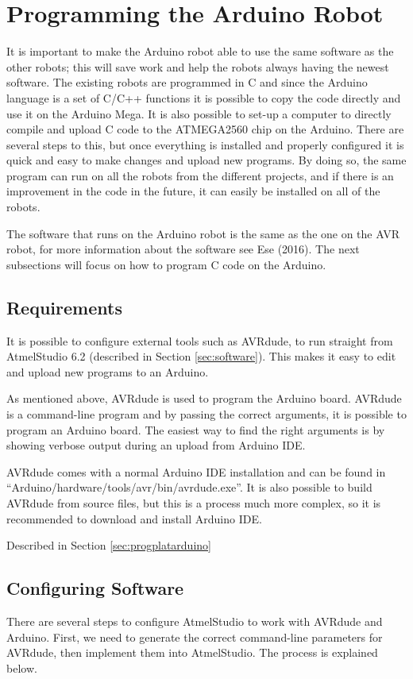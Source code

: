 \section{Programming the Arduino Robot}
\label{sec:programardu}
It is important to make the Arduino robot able to use the same software as the other robots; this will save work and help the robots always having the newest software. The existing robots are programmed in C and since the Arduino language is a set of C/C++ functions it is possible to copy the code directly and use it on the Arduino Mega. It is also possible to set-up a computer to directly compile and upload C code to the ATMEGA2560 chip on the Arduino. There are several steps to this, but once everything is installed and properly configured it is quick and easy to make changes and upload new programs. By doing so, the same program can run on all the robots from the different projects, and if there is an improvement in the code in the future, it can easily be installed on all of the robots.

The software that runs on the Arduino robot is the same as the one on the AVR robot, for more information about the software see Ese (2016). The next subsections will focus on how to program C code on the Arduino.

\subsection{Requirements}
It is possible to configure external tools such as AVRdude, to run straight from AtmelStudio 6.2 (described in Section \ref{sec:software}). This makes it easy to edit and upload new programs to an Arduino.

As mentioned above, AVRdude is used to program the Arduino board. AVRdude is a command-line program and by passing the correct arguments, it is possible to program an Arduino board. The easiest way to find the right arguments is by showing verbose output during an upload from Arduino IDE.

AVRdude comes with a normal Arduino IDE installation and can be found in ``Arduino/hardware/tools/avr/bin/avrdude.exe''. It is also possible to build AVRdude from source files, but this is a process much more complex, so it is recommended to download and install Arduino IDE.

Described in Section \ref{sec:progplatarduino}

\newpage
\subsection{Configuring Software}
\label{sec:configSoftware}
There are several steps to configure AtmelStudio to work with AVRdude and Arduino. First, we need to generate the correct command-line parameters for AVRdude, then implement them into AtmelStudio. The process is explained below.

